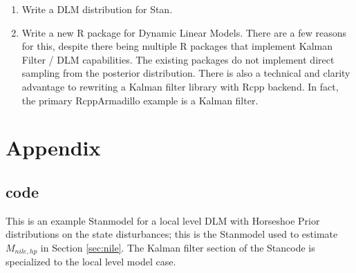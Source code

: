 \documentclass{article}
\newcommand{\Stan}{Stan}
\begin{document}
\begin{enumerate}
\item Write a DLM distribution for Stan.
\item Write a new R package for Dynamic Linear Models. There are a few reasons for this, despite there being multiple R packages that implement Kalman Filter / DLM capabilities. 
The existing packages do not implement direct sampling from the posterior distribution. 
There is also a technical and clarity advantage to rewriting a Kalman filter library with Rcpp backend. In fact, the primary RcppArmadillo example is 
a Kalman filter.
\end{enumerate}

\clearpage{}

\printbibliography{}

\section{Appendix}
\label{sec:appendix
}
\subsection{code}
\label{sec:code}

This is an example \Stan model for a local level DLM with Horseshoe Prior distributions on the state disturbances; this is the \Stan model used to estimate $M_{nile,hp}$ in Section \ref{sec:nile}. 
The Kalman filter section of the \Stan code is specialized to the local level model case.

\begin{singlespace}
    
\end{singlespace}
\end{document}
